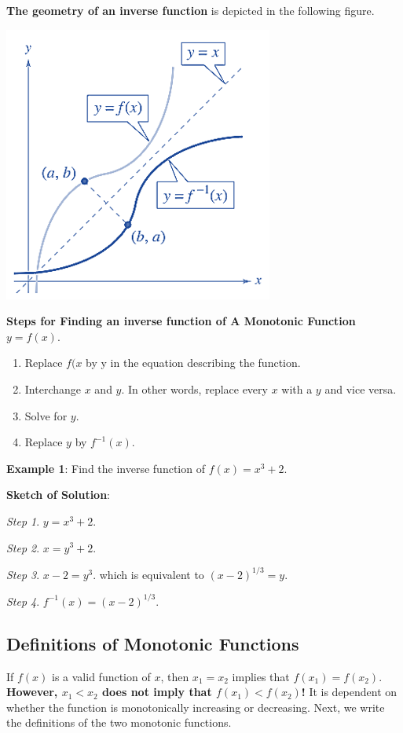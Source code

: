 \documentclass[
]{book}
\begin{document}
\textbf{The geometry of an inverse function} is depicted in the following figure.

\begin{center}\includegraphics[width=0.4\linewidth]{topic10/inverseGeometry} \end{center}

\textbf{Steps for Finding an inverse function of A Monotonic Function \(y =f(x)\)}.

\begin{enumerate}
\def\labelenumi{\arabic{enumi}.}
\item
  Replace \(f(x\) by y in the equation describing the function.
\item
  Interchange \(x\) and \(y\). In other words, replace every \(x\) with a \(y\) and vice versa.
\item
  Solve for \(y\).
\item
  Replace \(y\) by \(f^{-1}(x)\).
\end{enumerate}

\textbf{\color{red}Example 1}: Find the inverse function of \(f(x) = x^3 + 2\).

\textbf{Sketch of Solution}:

\emph{Step 1}. \(y = x^3 + 2\).

\emph{Step 2}. \(x = y^3 + 2\).

\emph{Step 3}. \(x - 2 = y^3\). which is equivalent to \((x - 2)^{1/3} = y\).

\emph{Step 4}. \(f^{-1}(x) = (x - 2)^{1/3}\).

\hypertarget{definitions-of-monotonic-functions}{%
\subsection{Definitions of Monotonic Functions}\label{definitions-of-monotonic-functions}}

If \(f(x)\) is a valid function of \(x\), then \(x_1 = x_2\) implies that \(f(x_1) = f(x_2)\). \textbf{\color{blue} However, \(x_1 < x_2\) does not imply that \(f(x_1) < f(x_2)\)!} It is dependent on whether the function is monotonically increasing or decreasing. Next, we write the definitions of the two monotonic functions.
\end{document}
